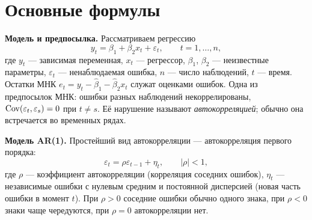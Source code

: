 %
%
%


\ifsolutions

\section{Основные формулы}

\textbf{Модель и предпосылка.} Рассматриваем регрессию
\[
  y_t = \beta_1 + \beta_2x_t + \varepsilon_t, \qquad t = 1, \dots, n,
\]
где $y_t$ — зависимая переменная, $x_t$ — регрессор, $\beta_1$, $\beta_2$ —
неизвестные параметры, $\varepsilon_t$ — ненаблюдаемая ошибка, $n$ — число
наблюдений, $t$ — время. Остатки МНК
$e_t = y_t - \widehat\beta_1 - \widehat\beta_2x_t$ служат оценками ошибок.
Одна из предпосылок МНК: ошибки разных наблюдений некоррелированы,
$\mathrm{Cov}(\varepsilon_t, \varepsilon_s) = 0$ при $t \ne s$. Её нарушение
называют \emph{автокорреляцией}; обычно она встречается во временных рядах.

\textbf{Модель AR(1).} Простейший вид автокорреляции — автокорреляция первого
порядка:
\[
  \varepsilon_t = \rho\varepsilon_{t-1} + \eta_t, \qquad |\rho| < 1,
\]
где $\rho$ — коэффициент автокорреляции (корреляция соседних ошибок), $\eta_t$
— независимые ошибки с нулевым средним и постоянной дисперсией (новая часть
ошибки в момент $t$). При $\rho > 0$ соседние ошибки обычно одного знака, при
$\rho < 0$ знаки чаще чередуются, при $\rho = 0$ автокорреляции нет.

